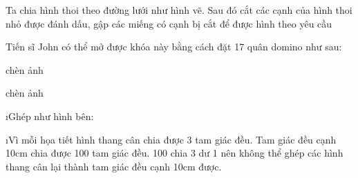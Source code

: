 \begin{Answer}{12}
		Ta chia hình thoi theo đường lưới như hình vẽ. Sau đó cắt các cạnh của hình thoi nhỏ được đánh dấu, gập các miếng có cạnh bị cắt để được hình theo yêu cầu
	
\end{Answer}
\begin{Answer}{13}
		Tiến sĩ John có thể mở được khóa này bằng cách đặt 17 quân domino như sau:
	
\end{Answer}
\begin{Answer}{14}
		chèn ảnh
	
\end{Answer}
\begin{Answer}{15}
		chèn ảnh
	
\end{Answer}
\begin{Answer}{16}
		\begin{enumerate}[a), leftmargin=*]
			\i Ghép như hình bên:
			
			\i Vì mỗi họa tiết hình thang cân chia được 3 tam giác đều. Tam giác đều cạnh 10cm chia được 100 tam giác đều. 100 chia 3 dư 1 nên không thể ghép các hình thang cân lại thành tam giác đều cạnh 10cm được.
		\end{enumerate}
	
\end{Answer}
